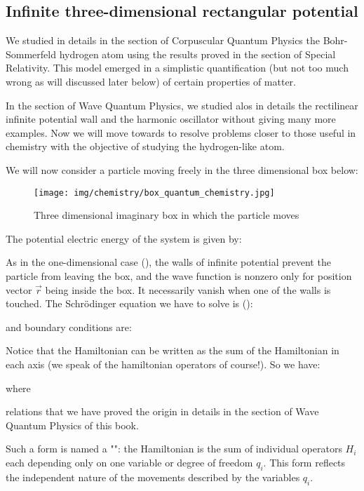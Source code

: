	\subsection{Infinite three-dimensional rectangular potential}
	We studied in details in the section of Corpuscular Quantum Physics the Bohr-Sommerfeld hydrogen atom using the results proved in the section of Special Relativity. This model emerged in a simplistic quantification (but not too much wrong as will discussed later below) of certain properties of matter.
	
	In the section of Wave Quantum Physics, we studied alos in details the rectilinear infinite potential wall and the harmonic oscillator without giving many more examples. Now we will move towards to resolve problems closer to those useful in chemistry with the objective of studying the hydrogen-like atom.
	
	We will now consider a particle moving freely in the three dimensional box below:
	\begin{figure}[H]
		\begin{center}
		\texttt{[image: img/chemistry/box\_quantum\_chemistry.jpg]}
		\end{center}	
		\caption[]{Three dimensional imaginary box in which the particle moves}
	\end{figure}

	The potential electric energy of the system is given by:	

	
	As in the one-dimensional case (), the walls of infinite potential prevent the particle from leaving the box, and the wave function is nonzero only for position vector $\vec{r}$ being inside the box. It  necessarily vanish when one of the walls is touched. The Schrödinger equation we have to solve is ():
	
	and boundary conditions are:
	
	Notice that the Hamiltonian can be written as the sum of the Hamiltonian in each axis (we speak of the hamiltonian operators of course!). So we have:
	
	where
	
	relations that we have proved the origin in details in the section of Wave Quantum Physics of this book.
	
	Such a form is named a "": the Hamiltonian is the sum of individual operators $H_i$ each depending only on one variable or degree of freedom $q_i$. This form reflects the independent nature of the movements described by the variables $q_i$.
	
